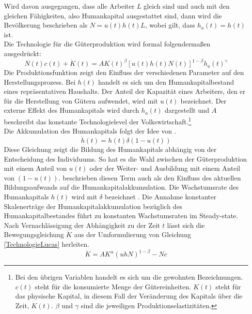 %
 Wird davon ausgegangen, dass alle Arbeiter $L$ gleich sind und auch mit den gleichen Fähigkeiten, also Humankapital ausgestattet sind, dann wird die Bevölkerung beschrieben als $N=u(t)h(t)L$, wobei gilt, dass $h_a(t)=h(t)$ ist.\\
%
 Die Technologie für die Güterproduktion wird formal folgendermaßen ausgedrückt:
%
\begin{equation}
N(t)c(t)+\dot{K}(t)=AK(t)^\beta[u(t)h(t)N(t)]^{1-\beta}h_a(t)^\gamma \label{TechnologieLucas}
\end{equation}
% 
Die Produktionsfunktion zeigt den Einfluss der verschiedenen Parameter auf den Herstellungsprozess. Bei $h(t)$ handelt es sich um den Humankapitalbestand eines repräsentativen Haushalts. Der Anteil der Kapazität eines Arbeiters, den er für die Herstellung von Gütern aufwendet, wird mit $u(t)$ bezeichnet. Der externe Effekt des Humankapitals wird durch $h_a(t)$ dargestellt und $A$ beschreibt das konstante Technologielevel der Volkswirtschaft.\footnote{Bei den übrigen Variablen handelt es sich um die gewohnten Bezeichnungen. $c(t)$ steht für die konsumierte Menge der Gütereinheiten. $K(t)$ steht für das physische Kapital, in diesem Fall der Veränderung des Kapitals über die Zeit, $\dot{K}(t)$. $\beta$ und $\gamma$ sind die jeweiligen Produktionselastizitäten.} \\
%
Die Akkumulation des Humankapitals folgt der Idee von \cite{Uzawa.1965}.
%
\begin{equation} 
	\dot{h}(t)=h(t)\delta(1-u(t)) 
\end{equation} 
%
Diese Gleichung zeigt die Bildung des Humankapitals abhängig von der Entscheidung des Individuums. So hat es die Wahl zwischen der Güterproduktion mit einem Anteil von $u(t)$ oder der Weiter- und Ausbildung mit einem Anteil von $(1-u(t))$. \cite[Kapitel 13]{Aghion.2015} beschrieben diesen Term auch als den Einfluss des aktuellen Bildungsaufwands auf die Humankapitalakkumulation. Die Wachstumsrate des Humankapitals $h(t)$ wird mit $\delta$ bezeichnet \cite[S.~17--19]{Lucas.1988}.
Die Annahme konstanter Skalenerträge der Humankapitalakkumulation bezüglich des Humankapitalbestandes führt zu konstanten Wachstumsraten im Steady-state.\\
%
Nach Vernachlässigung der Abhängigkeit zu der Zeit $t$ lässt sich die Bewegungsgleichung $\dot{K}$ aus der Umformulierung von Gleichung \eqref{TechnologieLucas} herleiten.
%
\begin{equation}
	\dot{K}=AK^\alpha(uhN)^{1-\beta}-Nc
\end{equation}
